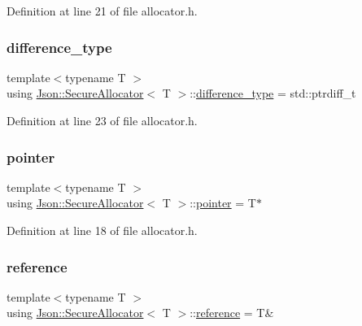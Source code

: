 Definition at line 21 of file allocator.\+h.

\hypertarget{class_json_1_1_secure_allocator_a404f41a8e340a8af1b54138920a6ef33}{}\label{class_json_1_1_secure_allocator_a404f41a8e340a8af1b54138920a6ef33} 
\subsubsection{\texorpdfstring{difference\+\_\+type}{difference\_type}}
{\footnotesize\ttfamily template$<$typename T $>$ \\
using \hyperlink{class_json_1_1_secure_allocator}{Json\+::\+Secure\+Allocator}$<$ T $>$\+::\hyperlink{class_json_1_1_secure_allocator_a404f41a8e340a8af1b54138920a6ef33}{difference\+\_\+type} =  std\+::ptrdiff\+\_\+t}



Definition at line 23 of file allocator.\+h.

\hypertarget{class_json_1_1_secure_allocator_a442c09b3267622d23416d9072ea1afe9}{}\label{class_json_1_1_secure_allocator_a442c09b3267622d23416d9072ea1afe9} 
\subsubsection{\texorpdfstring{pointer}{pointer}}
{\footnotesize\ttfamily template$<$typename T $>$ \\
using \hyperlink{class_json_1_1_secure_allocator}{Json\+::\+Secure\+Allocator}$<$ T $>$\+::\hyperlink{class_json_1_1_secure_allocator_a442c09b3267622d23416d9072ea1afe9}{pointer} =  T$\ast$}



Definition at line 18 of file allocator.\+h.

\hypertarget{class_json_1_1_secure_allocator_a55b243c56812b3852b59c1a9b0a21c65}{}\label{class_json_1_1_secure_allocator_a55b243c56812b3852b59c1a9b0a21c65} 
\subsubsection{\texorpdfstring{reference}{reference}}
{\footnotesize\ttfamily template$<$typename T $>$ \\
using \hyperlink{class_json_1_1_secure_allocator}{Json\+::\+Secure\+Allocator}$<$ T $>$\+::\hyperlink{class_json_1_1_secure_allocator_a55b243c56812b3852b59c1a9b0a21c65}{reference} =  T\&}



